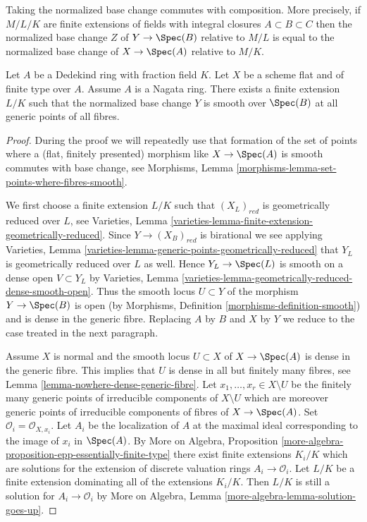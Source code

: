 \medskip\noindent
Taking the normalized base change commutes with composition.
More precisely, if $M/L/K$ are finite extensions
of fields with integral closures $A \subset B \subset C$
then the normalized base change $Z$ of $Y \to \Spec(B)$
relative to $M/L$ is equal to the normalized base change
of $X \to \Spec(A)$ relative to $M/K$.

\begin{theorem}
\label{theorem-normalized-base-change-with-reduced-fibre}
Let $A$ be a Dedekind ring with fraction field $K$.
Let $X$ be a scheme flat and of finite type over $A$.
Assume $A$ is a Nagata ring.
There exists a finite extension $L/K$ such that
the normalized base change $Y$ is smooth over $\Spec(B)$
at all generic points of all fibres.
\end{theorem}

\begin{proof}
During the proof we will repeatedly use that formation of the set of points
where a (flat, finitely presented) morphism like $X \to \Spec(A)$ is
smooth commutes with base change, see
Morphisms, Lemma \ref{morphisms-lemma-set-points-where-fibres-smooth}.

\medskip\noindent
We first choose a finite extension $L/K$ such that
$(X_L)_{red}$ is geometrically reduced over $L$, see
Varieties, Lemma \ref{varieties-lemma-finite-extension-geometrically-reduced}.
Since $Y \to (X_B)_{red}$ is birational we see applying
Varieties, Lemma \ref{varieties-lemma-generic-points-geometrically-reduced}
that $Y_L$ is geometrically reduced over $L$ as well.
Hence $Y_L \to \Spec(L)$ is smooth on a dense open $V \subset Y_L$ by
Varieties, Lemma \ref{varieties-lemma-geometrically-reduced-dense-smooth-open}.
Thus the smooth locus $U \subset Y$ of the morphism $Y \to \Spec(B)$
is open (by Morphisms, Definition \ref{morphisms-definition-smooth})
and is dense in the generic fibre. Replacing $A$ by $B$ and $X$ by $Y$
we reduce to the case treated in the next paragraph.

\medskip\noindent
Assume $X$ is normal and the smooth locus $U \subset X$ of $X \to \Spec(A)$
is dense in the generic fibre. This implies that $U$ is dense in all but
finitely many fibres, see Lemma \ref{lemma-nowhere-dense-generic-fibre}.
Let $x_1, \ldots, x_r \in X \setminus U$ be the finitely many generic
points of irreducible components of $X \setminus U$ which are moreover
generic points of irreducible components of fibres of $X \to \Spec(A)$.
Set $\mathcal{O}_i = \mathcal{O}_{X, x_i}$. Let $A_i$ be the localization of
$A$ at the maximal ideal corresponding to the image of $x_i$ in $\Spec(A)$.
By
More on Algebra, Proposition
\ref{more-algebra-proposition-epp-essentially-finite-type}
there exist finite extensions
$K_i/K$ which are solutions for the extension of discrete valuation
rings $A_i \to \mathcal{O}_i$. Let $L/K$ be a finite extension
dominating all of the extensions $K_i/K$. Then $L/K$
is still a solution for $A_i \to \mathcal{O}_i$ by
More on Algebra, Lemma \ref{more-algebra-lemma-solution-goes-up}.


\end{proof}

